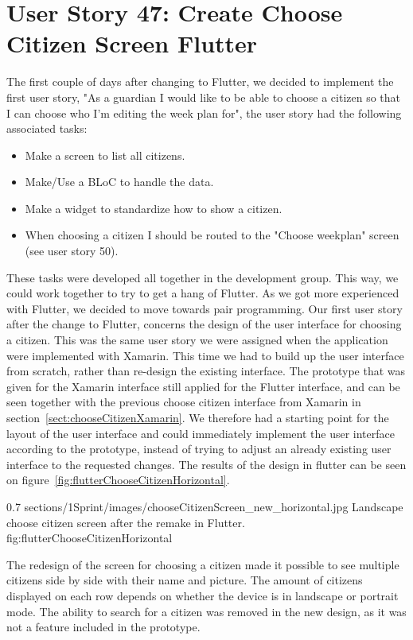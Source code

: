 \section{User Story 47: Create Choose Citizen Screen Flutter} 
\label{sect:chooseCitizenFlutter}
The first couple of days after changing to Flutter, we decided to implement the first user story, "As a guardian I would like to be able to choose a citizen so that I can choose who I’m editing the week plan for", the user story had the following associated tasks:

\begin{itemize}
    \item Make a screen to list all citizens.
    \item Make/Use a BLoC to handle the data.
    \item Make a widget to standardize how to show a citizen.
    \item When choosing a citizen I should be routed to the "Choose weekplan" screen (see user story 50).
\end{itemize}

These tasks were developed all together in the development group. This way, we could work together to try to get a hang of Flutter. As we got more experienced with Flutter, we decided to move towards pair programming.
Our first user story after the change to Flutter, concerns the design of the user interface for choosing a citizen. This was the same user story we were assigned when the application were implemented with Xamarin. This time we had to build up the user interface from scratch, rather than re-design the existing interface. 
The prototype that was given for the Xamarin interface still applied for the Flutter interface, and can be seen together with the previous choose citizen interface from Xamarin in section~\ref{sect:chooseCitizenXamarin}. We therefore had a starting point for the layout of the user interface and could immediately implement the user interface according to the prototype, instead of trying to adjust an already existing user interface to the requested changes.
The results of the design in flutter can be seen on figure~\ref{fig:flutterChooseCitizenHorizontal}.

        {0.7} %
        {sections/1Sprint/images/chooseCitizenScreen_new_horizontal.jpg} %
        {Landscape choose citizen screen after the remake in Flutter.} %
        {fig:flutterChooseCitizenHorizontal} %

The redesign of the screen for choosing a citizen made it possible to see multiple citizens side by side with their name and picture. The amount of citizens displayed on each row depends on whether the device is in landscape or portrait mode. 
The ability to search for a citizen was removed in the new design, as it was not a feature included in the prototype.